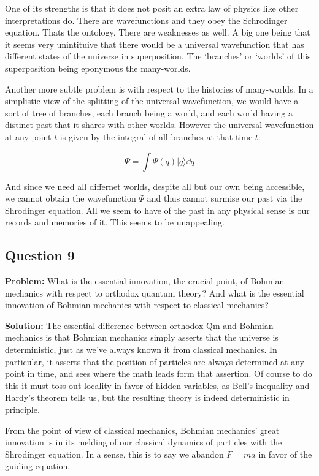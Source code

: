 \documentclass{article}
\begin{document}
One of its strengths is that it does not posit an extra law of physics like other interpretations do. There are wavefunctions and they obey the Schrodinger equation. Thats the ontology. There are weaknesses as well. A big one being that it seems very unintituive that there would be a universal wavefunction that has different states of the universe in superposition. The `branches' or `worlds' of this superposition being eponymous the many-worlds.

Another more subtle problem is with respect to the histories of many-worlds. In a simplistic view of the splitting of the universal wavefunction, we would have a sort of tree of branches, each branch being a world, and each world having a distinct past that it shares with other worlds. However the universal wavefunction at any point $t$ is given by the integral of all branches at that time $t$:

$$\Psi=\int \Psi(q)|q\rangle\dd{q}$$

And since we need all differnet worlds, despite all but our own being accessible, we cannot obtain the wavefunction $\Psi$ and thus cannot surmise our past via the Shrodinger equation. All we seem to have of the past in any physical sense is our records and memories of it. This seems to be unappealing.

\subsection*{Question 9}
\noindent\textbf{Problem:} What is the essential innovation, the crucial point, of Bohmian mechanics with respect to orthodox quantum theory? And what is the essential innovation of Bohmian mechanics with respect to classical mechanics?
\bigskip

\noindent\textbf{Solution:} The essential difference between orthodox Qm and Bohmian mechanics is that Bohmian mechanics simply asserts that the universe is deterministic, just as we've always known it from classical mechanics. In particular, it asserts that the position of particles are always determined at any point in time, and sees where the math leads form that assertion. Of course to do this it must toss out locality in favor of hidden variables, as Bell's inequality and Hardy's theorem tells us, but the resulting theory is indeed deterministic in principle.

From the point of view of classical mechanics, Bohmian mechanics' great innovation is in its melding of our classical dynamics of particles with the Shrodinger equation. In a sense, this is to say we abandon $F=ma$ in favor of the guiding equation.
\end{document}
